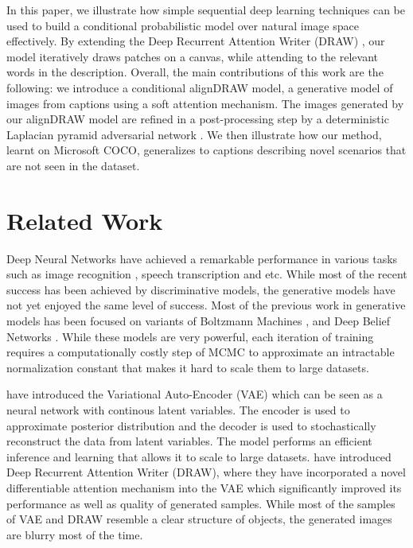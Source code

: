 \documentclass{article} %
\begin{document}
In this paper, we illustrate how simple sequential deep learning techniques can be used to build a conditional probabilistic model over natural image space effectively. By extending the Deep Recurrent Attention Writer (DRAW) \citep{gregor_draw}, our model iteratively draws patches on a canvas, while attending to the relevant words in the description. Overall, the main contributions of this work are the following: we introduce a conditional alignDRAW model, a generative model of images from captions using a soft attention mechanism. The images generated by our alignDRAW model are refined in a post-processing step by a deterministic Laplacian pyramid adversarial network \citep{denton_lapgan}. We then illustrate how our method, learnt on Microsoft COCO, generalizes to captions describing novel scenarios that are not seen in the dataset.

\section{Related Work}

Deep Neural Networks have achieved a remarkable performance in various tasks such as image recognition \citep{krizhevsky_imagenet}, speech transcription \citep{graves_speech} and etc. While most of the recent success has been achieved by discriminative models, the generative models have not yet enjoyed the same level of success. Most of the previous work in generative models has been focused on variants of Boltzmann Machines \citep{smolensky_rbm}, \citep{russ_dbm} and Deep Belief Networks \citep{hinton_dbn}. While these models are very powerful, each iteration of training requires a computationally costly step of MCMC to approximate an intractable normalization constant that makes it hard to scale them to large datasets.

\cite{kingma_vae} have introduced the Variational Auto-Encoder (VAE) which can be seen as a neural network with continous latent variables. The encoder is used to approximate posterior distribution and the decoder is used to stochastically reconstruct the data from latent variables. The model performs an efficient inference and learning that allows it to scale to large datasets. \cite{gregor_draw} have introduced Deep Recurrent Attention Writer (DRAW), where they have incorporated a novel differentiable attention mechanism into the VAE which significantly improved its performance as well as quality of generated samples. While most of the samples of VAE and DRAW resemble a clear structure of objects, the generated images are blurry most of the time.
\end{document}
